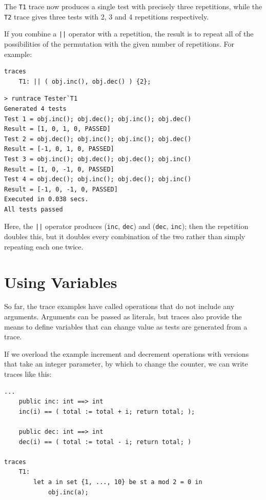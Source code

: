 \documentclass{overturerepchap}
\begin{document}
The \texttt{T1} trace now produces a single test with precisely three repetitions, while
the \texttt{T2} trace gives three tests with 2, 3 and 4 repetitions respectively.

If you combine a \texttt{||} operator with a repetition, the result is to repeat
all of the possibilities of the permutation with the given number of repetitions.
For example:

\small
\begin{lstlisting}
traces
    T1: || ( obj.inc(), obj.dec() ) {2};
\end{lstlisting}

\lstset{style=tool,language=}
\begin{lstlisting}[escapechar=@]
> runtrace Tester`T1
Generated 4 tests
Test 1 = obj.inc(); obj.dec(); obj.inc(); obj.dec()
Result = [1, 0, 1, 0, PASSED]
Test 2 = obj.dec(); obj.inc(); obj.inc(); obj.dec()
Result = [-1, 0, 1, 0, PASSED]
Test 3 = obj.inc(); obj.dec(); obj.dec(); obj.inc()
Result = [1, 0, -1, 0, PASSED]
Test 4 = obj.dec(); obj.inc(); obj.dec(); obj.inc()
Result = [-1, 0, -1, 0, PASSED]
Executed in 0.038 secs. 
All tests passed
\end{lstlisting}
\lstset{style=mystyle}
\lstset{language=VDM++}
\normalsize

Here, the \texttt{||} operator produces (\texttt{inc}, \texttt{dec}) and (\texttt{dec}, \texttt{inc}); then the
repetition doubles this, but it doubles every combination of the two rather than
simply repeating each one twice.

\section{Using Variables}

So far, the trace examples have called operations that do not include any
arguments. Arguments can be passed as literals, but traces also provide the
means to define variables that can change value as tests are generated from a
trace.

If we overload the example increment and decrement operations with versions that
take an integer parameter, by which to change the counter, we can write traces
like this:

\small
\begin{lstlisting}
...
    public inc: int ==> int
    inc(i) == ( total := total + i; return total; );

    public dec: int ==> int
    dec(i) == ( total := total - i; return total; )

traces
    T1:
        let a in set {1, ..., 10} be st a mod 2 = 0 in
            obj.inc(a);
\end{lstlisting}
\end{document}
